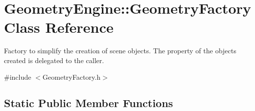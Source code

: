\hypertarget{class_geometry_engine_1_1_geometry_factory}{}\section{Geometry\+Engine\+::Geometry\+Factory Class Reference}
\label{class_geometry_engine_1_1_geometry_factory}


Factory to simplify the creation of scene objects. The property of the objects created is delegated to the caller.  




{\ttfamily \#include $<$Geometry\+Factory.\+h$>$}

\subsection*{Static Public Member Functions}
